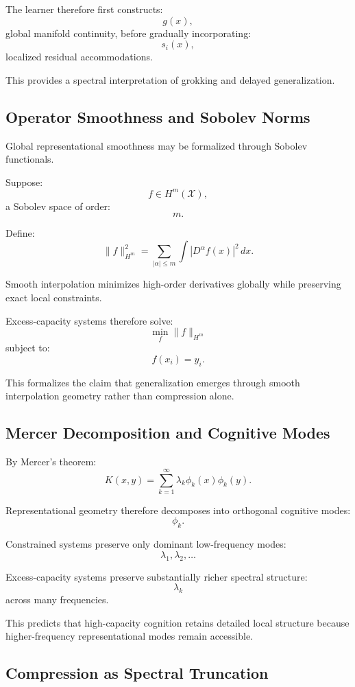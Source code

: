 \documentclass[12pt,a4paper]{article}
\begin{document}
The learner therefore first constructs:
\[
g(x),
\]
global manifold continuity,
before gradually incorporating:
\[
s_i(x),
\]
localized residual accommodations.

This provides a spectral interpretation of grokking and delayed generalization.

\subsection{Operator Smoothness and Sobolev Norms}

Global representational smoothness may be formalized through Sobolev functionals.

Suppose:
\[
f
\in
H^m(\mathcal{X}),
\]
a Sobolev space of order:
\[
m.
\]

Define:
\[
\|f\|_{H^m}^2
=
\sum_{|\alpha|\leq m}
\int
|D^\alpha f(x)|^2
\,dx.
\]

Smooth interpolation minimizes high-order derivatives globally while preserving exact local constraints.

Excess-capacity systems therefore solve:
\[
\min_f
\|f\|_{H^m}
\]
subject to:
\[
f(x_i)=y_i.
\]

This formalizes the claim that generalization emerges through smooth interpolation geometry rather than compression alone.

\subsection{Mercer Decomposition and Cognitive Modes}

By Mercer's theorem:
\[
K(x,y)
=
\sum_{k=1}^\infty
\lambda_k
\phi_k(x)\phi_k(y).
\]

Representational geometry therefore decomposes into orthogonal cognitive modes:
\[
\phi_k.
\]

Constrained systems preserve only dominant low-frequency modes:
\[
\lambda_1,
\lambda_2,
\ldots
\]

Excess-capacity systems preserve substantially richer spectral structure:
\[
\lambda_k
\]
across many frequencies.

This predicts that high-capacity cognition retains detailed local structure because higher-frequency representational modes remain accessible.

\subsection{Compression as Spectral Truncation}
\end{document}
